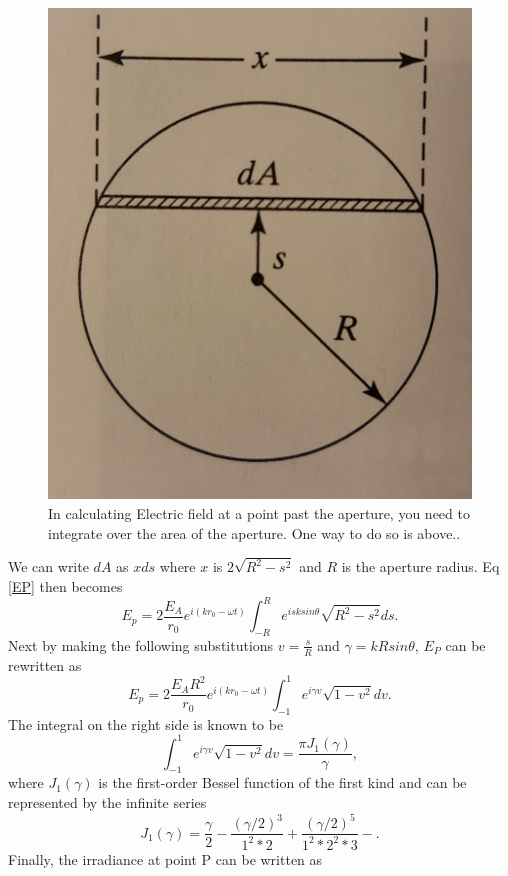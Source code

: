 \documentclass[ notitlepage, numerical, 11pt]{revtex4-1} %
\begin{document}
\begin{figure}[H]
\centerline{\includegraphics[scale=.20]{bessel.jpg}}
\caption{In calculating Electric field at a point past the aperture, you need to integrate over the area of the aperture. One way to do so is above.\cite{optics}.}
\label{aperture}
\end{figure}  We can write $dA$ as $xds$ where $x$ is $2\sqrt{R^2 - s^2}$ and $R$ is the aperture radius. Eq \ref{EP} then becomes 
\begin{equation}
E_p = 2\frac{E_A}{r_0}e^{i(k r_0 -\omega t)}\int_{-R}^R e^{i s k sin\theta}\sqrt{R^2 - s^2}ds.
\label{EP2}
\end{equation}
Next by making the following substitutions $v = \frac{s}{R}$ and $\gamma = kRsin\theta$, $E_P$ can be rewritten as
\begin{equation}
E_p = 2\frac{E_A R^2}{r_0}e^{i(k r_0 -\omega t)}\int_{-1}^1 e^{i \gamma v}\sqrt{1 - v^2}dv.
\label{EP3}
\end{equation}
The integral on the right side is known to be
\begin{equation}
\int_{-1}^1 e^{i \gamma v}\sqrt{1 - v^2}dv = \frac{\pi J_1(\gamma)}{\gamma},
\label{bessel}
\end{equation}
where $J_1(\gamma)$ is the first-order Bessel function of the first kind and can be represented by the infinite series \cite{optics}
\begin{equation}
J_1(\gamma) = \frac{\gamma}{2} - \frac{(\gamma /2)^3}{1^2 *2} + \frac{(\gamma /2)^5}{1^2 *2^2 *3} - .
\label{besselSeries}
\end{equation} 
Finally, the irradiance at point P can be written as 
\end{document}
